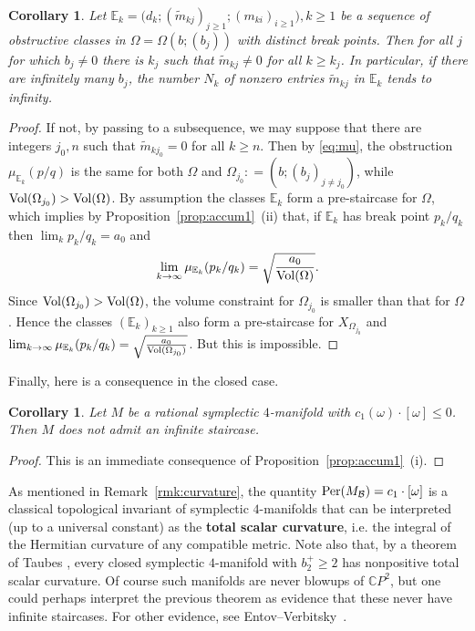 \documentclass[11pt, reqno]{amsart}
\newtheorem{cor}[thm]{Corollary}
\theoremstyle{remark}
\numberwithin{equation}{subsection}
\numberwithin{figure}{section}
\theoremstyle{customremark}
\newcommand{\Vol}{{\rm Vol}}
\newcommand{\Per}{{\rm Per}}
\newcommand{\Tm}{{\widetilde m}}
\newcommand{\bE}{{\mathbb E}}
\newcommand{\Om}{{\Omega}}
\begin{document}
\begin{cor}\label{cor:accum3} 
Let  $\bE_k = \bigl(d_k; (\Tm_{kj})_{j\ge 1}; (m_{ki})_{i\ge 1}\bigr), k\ge 1$ be a sequence of obstructive classes in
 $\Om = \Om(b; (b_j))$ with distinct break points.
  Then for all $j$ for which $b_j\ne 0$ there is $k_j$ such that $\Tm_{kj}\ne 0$ for all $k\ge k_j$.
In particular, if there are infinitely many $b_j$, the number $N_k$ of nonzero entries $\Tm_{kj}$ in $\bE_k$ tends to infinity.
\end{cor}
\begin{proof} If not, by passing to a subsequence, we may suppose that there are integers  $j_0, n$ such that $\Tm_{kj_0} = 0$ for all $k\ge n$.   Then by \eqref{eq:mu}, the obstruction $\mu_{\bE_k}(p/q)$  is the same for both $\Om$ and $\Om_{j_0}: = (b; (b_j)_{j\ne j_0})$, while $\Vol(\Om_{j_0}) > \Vol(\Om)$. 
 By assumption the classes $\bE_k$ form a pre-staircase for $\Om$, which implies by Proposition~\ref{prop:accum1}~(ii) that, if $\bE_k$ has break point $p_k/q_k$ then $\lim_k p_k/q_k = a_0$ and
 $$
 \lim_{k\to \infty} \mu_{\bE_k}(p_k/q_k) = \sqrt{\frac{a_0}{\Vol(\Om)}}.
 $$
Since $\Vol(\Om_{j_0})> \Vol(\Om)$, the volume constraint  for $\Om_{j_0}$ is smaller than that for $\Om$. Hence the classes
$(\bE_k)_{k\ge 1}$ also form a pre-staircase for $X_{\Om_{j_0}}$  and
$ \lim_{k\to \infty} \mu_{\bE_k}(p_k/q_k) = \sqrt{\frac{a_0}{\Vol(\Om_{j_0})}}$.  But this is impossible.
\end{proof}
Finally, here is a consequence in the closed case. 


\begin{cor}\label{cor:curvature}
Let $M$ be a rational symplectic $4$-manifold with $c_1(\omega) \cdot [\omega] \le 0$.  Then $M$ does not admit an infinite staircase.
\end{cor}

\begin{proof} This is an immediate consequence of Proposition~\ref{prop:accum1}~(i).
\end{proof}

As mentioned in Remark~\ref{rmk:curvature}, the quantity $\Per(M_{\mathcal{B}})=c_1 \cdot [\omega]$ is a classical topological invariant of symplectic $4$-manifolds that can be interpreted  (up to a universal constant) as the {\bf total scalar curvature}, i.e. the integral of the Hermitian curvature of any compatible metric. 
Note also that, by a theorem of Taubes \cite{Taubes}, every closed symplectic $4$-manifold with $b^+_2 \ge 2$ has nonpositive total scalar curvature.  Of course such manifolds are never blowups of $\mathbb{C}P^2$, but one could perhaps interpret the previous theorem as evidence that these never have infinite staircases.  For other evidence, see Entov--Verbitsky~\cite{EV}.
\end{document}
